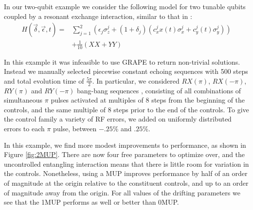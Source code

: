\documentclass[aps,nofootinbib,pra,notitlepage,twocolumn]{revtex4-1}
\begin{document}
In our two-qubit example we consider the following model for two tunable qubits coupled by a resonant exchange interaction, similar to that in \cite{McKay2016}:
\begin{equation} \label{eq:2Qham}
\begin{split}
H(\vec{\delta}, \vec{\epsilon}, t) = &\sum_{j=1}^2(\epsilon_j\sigma_z^j + (1 + \delta_j)(c_x^jx(t)\sigma_x^j + c_y^j(t)\sigma_y^j)) \\
&+ \frac{1}{10}(XX + YY)
\end{split}
\end{equation}

In this example it was infeasible to use GRAPE to return non-trivial solutions. Instead we manually selected piecewise constant echoing sequences with 500 steps and total evolution time of $\frac{5\pi}{2}$. In particular, we considered $RX(\pi)$, $RX(-\pi)$, $RY(\pi)$ and $RY(-\pi)$ bang-bang sequences \cite{bangbang}, consisting of all combinations of simultaneous $\pi$ pulses activated at multiples of $8$ steps from the beginning of the controls, and the same multiple of $8$ steps prior to the end of the controls. To give the control family a variety of RF errors, we added on uniformly distributed errors to each $\pi$ pulse, between $-.25$\% and $.25$\%.

In this example, we find more modest improvements to performance, as shown in Figure \ref{fig:2MUP}. There are now four free parameters to optimize over, and the uncontrolled entangling interaction means that there is little room for variation in the controls. Nonetheless, using a MUP improves performance by half of an order of magnitude at the origin relative to the constituent controls, and up to an order of magnitude away from the origin. For all values of the drifting parameters we see that the 1MUP performs as well or better than 0MUP.
\end{document}
